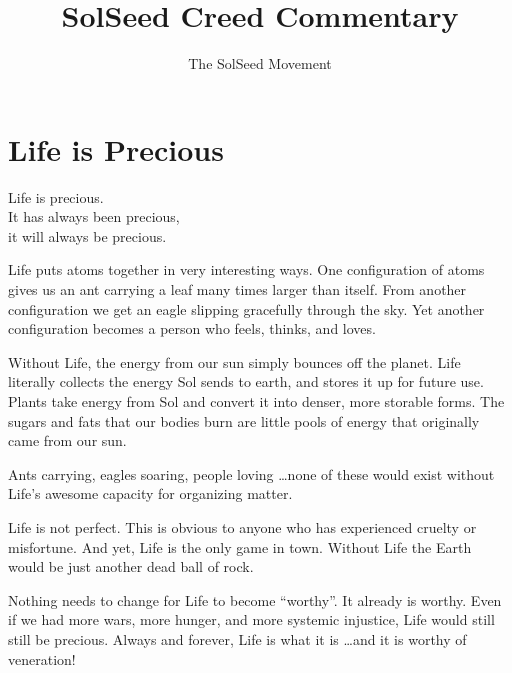 \documentclass[ebook,12pt,openany,twoside]{memoir}
\newcommand{\tab}{\hspace*{2em}}
\newcommand{\imagefacingchapter}[1]{
  \cleartoverso
  \clearpage \null
  \thispagestyle{cleared}
  \AddToShipoutPictureBG*{%
    \AtStockLowerLeft{%
      \texttt{[image: \#1]}
    }
  }
  \clearpage
}
\begin{document}
\title{\textbf{SolSeed Creed Commentary}}
\author{The SolSeed Movement}
\begin{titlingpage}
\maketitle
\end{titlingpage}


\cleartorecto
\thispagestyle{cleared}

\pagestyle{plain}

\imagefacingchapter{images/LifeIsWorthyOfVeneration}
\chapter{Life is Precious}

\setlength\epigraphwidth{2.25in}
\epigraph{
  Life is precious.\\
  \tab It has always been precious,\\
  \tab it will always be precious.
}{}

\noindent Life puts atoms together in very interesting ways. One configuration
of atoms gives us an ant carrying a leaf many times larger than itself. From
another configuration we get an eagle slipping gracefully through the sky. Yet
another configuration becomes a person who feels, thinks, and loves.

Without Life, the energy from our sun simply bounces off the planet. Life
literally collects the energy Sol sends to earth, and stores it up for future
use. Plants take energy from Sol and convert it into denser, more storable
forms. The sugars and fats that our bodies burn are little pools of energy that
originally came from our sun.

Ants carrying, eagles soaring, people loving \ldots none of these would exist
without Life's awesome capacity for organizing matter.

Life is not perfect. This is obvious to anyone who has experienced cruelty or
misfortune. And yet, Life is the only game in town. Without Life the Earth
would be just another dead ball of rock.

Nothing needs to change for Life to become ``worthy''. It already is worthy.
Even if we had more wars, more hunger, and more systemic injustice, Life would
still still be precious. Always and forever, Life is what it is \ldots and it
is worthy of veneration!
\end{document}
